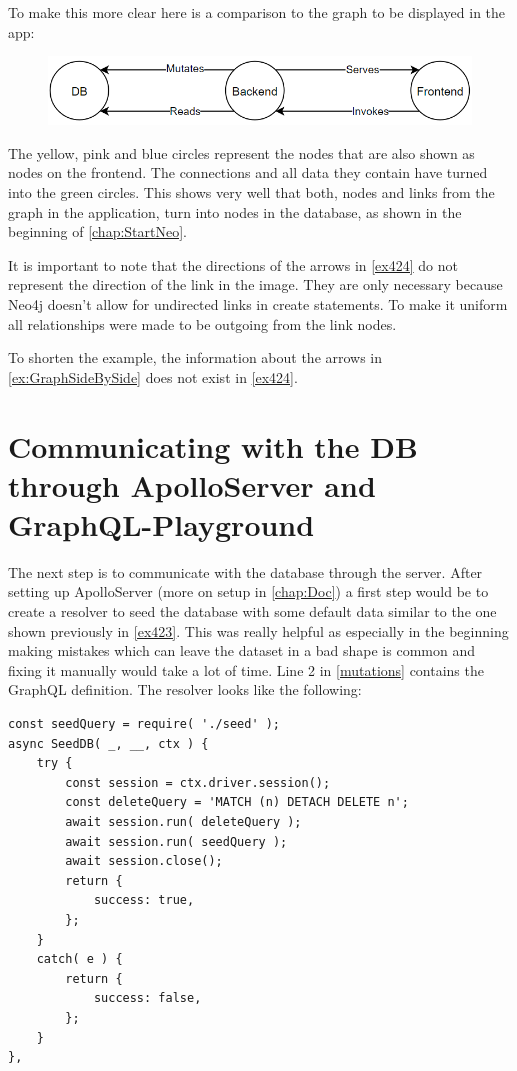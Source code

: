 To make this more clear here is a comparison to the graph to be displayed in the app:
\begin{figure}[H]
\centering
\includegraphics[scale=.8]{Bilder/BasicGraph.png}
\label{ex:GraphSideBySide}
\end{figure}

The yellow, pink and blue circles represent the nodes that are also shown as nodes on the frontend. The connections and all data they contain have turned into the green circles. This shows very well that both, nodes and links from the graph in the application, turn into nodes in the database, as shown in the beginning of \autoref{chap:StartNeo}.

It is important to note that the directions of the arrows in \autoref{ex424} do not represent the direction of the link in the image. They are only necessary because Neo4j doesn't allow for undirected links in create statements. To make it uniform all relationships were made to be outgoing from the link nodes.

To shorten the example, the information about the arrows in \autoref{ex:GraphSideBySide} does not exist in \autoref{ex424}. 

\section{Communicating with the DB through ApolloServer and GraphQL-Playground}
The next step is to communicate with the database through the server. After setting up ApolloServer (more on setup in \autoref{chap:Doc}) a first step would be to create a resolver to seed the database with some default data similar to the one shown previously in \autoref{ex423}. This was really helpful as especially in the beginning making mistakes which can leave the dataset in a bad shape is common and fixing it manually would take a lot of time. Line 2 in \autoref{mutations} contains the GraphQL definition. 
\newpage
The resolver looks like the following:
\lstset{language=JavaScript}
\begin{lstlisting}[caption={Seed Resolver}]
const seedQuery = require( './seed' );
async SeedDB( _, __, ctx ) {
	try {
		const session = ctx.driver.session();
		const deleteQuery = 'MATCH (n) DETACH DELETE n';
		await session.run( deleteQuery );
		await session.run( seedQuery );
		await session.close();
		return {
			success: true,
		};
	}
	catch( e ) {
		return {
			success: false,
		};	
	}
},
\end{lstlisting}

